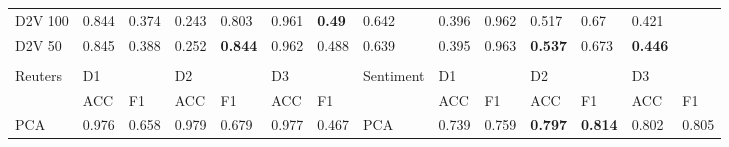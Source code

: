 {\begin{landscape}
\begin{table}[]
\begin{tabular}{llllllllllllll}
D2V 100    & 0.844                           & 0.374                           & 0.243                           & 0.803                           & 0.961                           & \textbf{0.49}  & 0.642                           & 0.396                           & 0.962                           & 0.517                           & 0.67                            & 0.421                           &                                 \\
D2V 50     & 0.845                           & 0.388                           & 0.252                           & \textbf{0.844} & 0.962                           & 0.488                           & 0.639                           & 0.395                           & 0.963                           & \textbf{0.537} & 0.673                           & \textbf{0.446} &                                 \\
&                                 &                                 &                                 &                                 &                                 &                                 &                                 &                                 &                                 &                                 &                                 &                                 &                                 \\
Reuters    & D1                              &                                 & D2                              &                                 & D3                              &                                 & Sentiment                       & D1                              &                                 & D2                              &                                 & D3                              &                                 \\
& ACC                             & F1                              & ACC                             & F1                              & ACC                             & F1                              &                                 & ACC                             & F1                              & ACC                             & F1                              & ACC                             & F1                              \\
PCA        & 0.976                           & 0.658                           & 0.979                           & 0.679                           & 0.977                           & 0.467                           & PCA                             & 0.739                           & 0.759                           & \textbf{0.797} & \textbf{0.814} & 0.802                           & 0.805                           \\

\end{tabular}
\end{table}
\end{landscape}}
